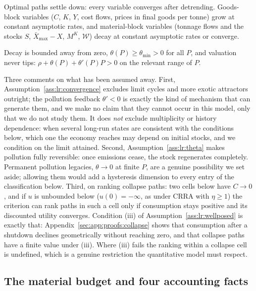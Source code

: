 \begin{assumption}[convergence]\label{ass:lr:convergence}
Optimal paths settle down: every variable converges after detrending. Goods-block variables ($C$, $K$, $Y$, cost flows, prices in final goods per tonne) grow at constant asymptotic rates, and material-block variables (tonnage flows and the stocks $S$, $\bar X_{\max}-X$, $M^K$, $\mathcal W$) decay at constant asymptotic rates or converge.
\end{assumption}

\begin{assumption}\label{ass:lr:theta}
Decay is bounded away from zero, $\theta\left(P\right)\ge\theta_{\min}>0$ for all $P$, and valuation never tips: $\rho+\theta\left(P\right)+\theta'\left(P\right)P>0$ on the relevant range of $P$.
\end{assumption}

Three comments on what has been assumed away. First, Assumption~\ref{ass:lr:convergence} excludes limit cycles and more exotic attractors outright; the pollution feedback $\theta'<0$ is exactly the kind of mechanism that can generate them, and we make no claim that they cannot occur in this model, only that we do not study them. It does \emph{not} exclude multiplicity or history dependence: when several long-run states are consistent with the conditions below, which one the economy reaches may depend on initial stocks, and we condition on the limit attained. Second, Assumption~\ref{ass:lr:theta} makes pollution fully reversible: once emissions cease, the stock regenerates completely. Permanent pollution legacies, $\theta\to0$ at finite $P$, are a genuine possibility we set aside; allowing them would add a hysteresis dimension to every entry of the classification below. Third, on ranking collapse paths: two cells below have $C\to0$, and if $u$ is unbounded below ($u\left(0\right)=-\infty$, as under CRRA with $\eta\ge1$) the criterion can rank paths in such a cell only if consumption stays positive and its discounted utility converges. Condition (iii) of Assumption~\ref{ass:lr:wellposed} is exactly that: Appendix~\ref{sec:app:proofs:collapse} shows that consumption after a shutdown declines geometrically without reaching zero, and that collapse paths have a finite value under (iii). Where (iii) fails the ranking within a collapse cell is undefined, which is a genuine restriction the quantitative model must respect.

\subsection{The material budget and four accounting facts}\label{sec:sp:longrun:budget}

